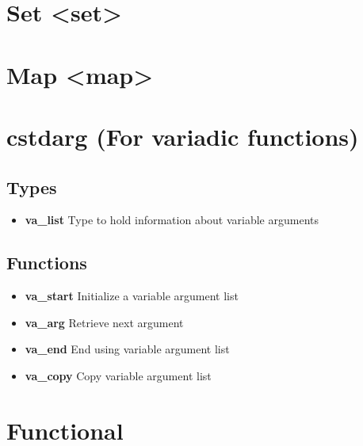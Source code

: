 \documentclass{report}
\begin{document}
    \pagebreak \bigbreak \noindent 
    \section{\LARGE Set <set>}
    \bigbreak \noindent 

    \pagebreak \bigbreak \noindent 
    \section{\LARGE Map <map>}
    \bigbreak \noindent 

    \pagebreak \bigbreak \noindent 
    \section{\LARGE cstdarg (For variadic functions)}
    \bigbreak \noindent 
    \subsection{Types}
    \begin{itemize}
        \item \textbf{va\_list} Type to hold information about variable arguments 
    \end{itemize}
    \bigbreak \noindent 
    \subsection{Functions}
    \begin{itemize}
        \item \textbf{va\_start}	Initialize a variable argument list 
        \item \textbf{va\_arg} Retrieve next argument 
        \item \textbf{va\_end} End using variable argument list 
        \item \textbf{va\_copy} Copy variable argument list 
    \end{itemize}

    \pagebreak \bigbreak \noindent 
    \section{\LARGE Functional}
    \bigbreak \noindent 




%
%
%     

%
%
%

    
\end{document}
